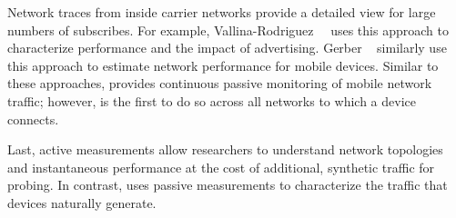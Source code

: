 Network traces from inside carrier networks provide a detailed view for large numbers 
of subscribes. For example, Vallina-Rodriguez~\etal~\cite{vallina-rod:ads} uses this approach to characterize performance and 
the impact of advertising. Gerber \etal~\cite{gerber:passivespeed} similarly use this approach to 
estimate network performance for mobile devices.  \cite{maier:mobtraffic} \cite{chen:wifi}
Similar to these approaches, \platname provides continuous passive monitoring of mobile network 
traffic; however, \platname is the first to do so across all networks to which a device connects.

Last, active measurements allow researchers to understand network topologies and instantaneous 
performance at the cost of additional, synthetic traffic for probing. In contrast, \platname uses 
passive measurements to characterize the traffic that devices naturally generate.


